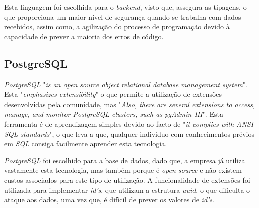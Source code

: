Esta linguagem foi escolhida para o \textit{backend}, visto que, assegura as tipagens, o que proporciona um maior nível de segurança quando se trabalha com dados recebidos, assim como, a agilização do processo de programação devido à capacidade de prever a maioria dos erros de código.

\subsection{PostgreSQL}
\emph{PostgreSQL} "\emph{is an open source object relational database management system}"\citep{Juba2015}. Esta "\emph{emphasizes extensibility}"\citep{Juba2015} o que permite a utilização de extensões desenvolvidas pela comunidade, mas "\emph{Also, there are several extensions to access, manage, and monitor PostgreSQL clusters, such as pgAdmin III}"\citep{Juba2015}. Esta ferramenta é de aprendizagem simples devido ao facto de "\emph{it complies with ANSI SQL standards}"\citep{Juba2015}, o que leva a que, qualquer individuo com conhecimentos prévios em \emph{SQL} consiga facilmente aprender esta tecnologia.

\emph{PostgreSQL} foi escolhido para a base de dados, dado que, a empresa já utiliza vastamente esta tecnologia, mas também porque é \emph{open source} e não existem custos associados para este tipo de utilização. A funcionalidade de extensões foi utilizada para implementar \emph{id's}, que utilizam a estrutura \emph{uuid}, o que dificulta o ataque aos dados, uma vez que, é difícil de prever os valores de \emph{id's}.







\newpage



\newpage



